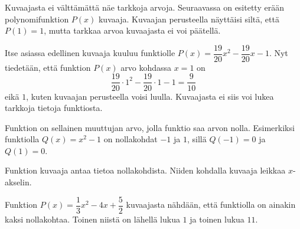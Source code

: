 \begin{esimerkki}
Kuvaajasta ei välttämättä näe tarkkoja arvoja. Seuraavassa on esitetty erään polynomifunktion $P(x)$ kuvaaja. Kuvaajan perusteella näyttäisi siltä, että $P(1)=1$, mutta tarkkaa arvoa kuvaajasta ei voi päätellä.
 
\begin{kuvaajapohja}[\kuvaajaAsetusEiRuudukkoa]{1}{-2}{2}{-2}{2}
\end{kuvaajapohja}
 
Itse asiassa edellinen kuvaaja kuuluu funktiolle $P(x)=\dfrac{19}{20} x^2-\dfrac{19}{20} x-1$. Nyt tiedetään, että funktion $P(x)$ arvo kohdassa $x=1$ on
$$\dfrac{19}{20}\cdot 1^2-\dfrac{19}{20} \cdot 1-1=\dfrac{9}{10}$$
eikä $1$, kuten kuvaajan perusteella voisi luulla. Kuvaajasta ei siis voi lukea tarkkoja tietoja funktiosta.
\end{esimerkki}

Funktion  on sellainen muuttujan arvo, jolla funktio saa arvon nolla. Esimerkiksi funktiolla $Q(x)=x^2-1$
on nollakohdat $-1$ ja $1$, sillä $Q(-1)=0$ ja $Q(1)=0$.

Funktion kuvaaja antaa tietoa nollakohdista. Niiden kohdalla kuvaaja leikkaa $x$-akselin.

\begin{esimerkki}
Funktion $P(x) = \dfrac{1}{3}x^2-4x+\dfrac{5}{2}$ kuvaajasta nähdään, että funktiolla on ainakin kaksi nollakohtaa. Toinen niistä on lähellä lukua $1$ ja toinen lukua $11$.

\begin{kuvaajapohja}{0.3}{-5}{15}{-10}{5}
\end{kuvaajapohja}
\end{esimerkki}


